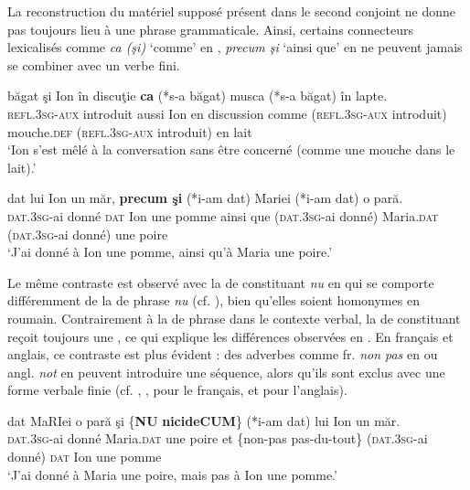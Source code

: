 La reconstruction du matériel supposé présent dans le second conjoint ne donne pas toujours lieu à une phrase grammaticale. Ainsi, certains connecteurs lexicalisés comme \textit{ca (şi)} ‘comme’ en , \textit{precum şi} ‘ainsi que’ en  ne peuvent jamais se combiner avec un verbe fini.

\ea \label{ch2:ex287}
\ea 
\gll {}  băgat  şi  Ion  în  discuţie  \textbf{ca}  (*s-a  băgat) musca  (*s-a  băgat)  în  lapte. \label{ch2:ex287a}\\ 
\textsc{refl.3sg-aux} introduit  aussi  Ion  en  discussion  comme  (\textsc{refl.3sg-aux} introduit) mouche.\textsc{def} (\textsc{refl.3sg-aux} introduit) en  lait\\
\glt ‘Ion s’est mêlé à la conversation sans être concerné (comme une mouche dans le lait).’

\ex  
\gll {}  dat  lui  Ion  un  măr,  \textbf{precum  şi}  (*i-am  dat) Mariei  (*i-am  dat)  o  pară. \label{ch2:ex287b}\\ 
\textsc{dat.3sg-}ai  donné  \textsc{dat}  Ion  une  pomme  {ainsi  que}  (\textsc{dat.3sg-}ai  donné) Maria.\textsc{dat}  (\textsc{dat.3sg-}ai  donné)  une  poire\\
\glt ‘J’ai donné à Ion une pomme, ainsi qu’à Maria une poire.’
\z
\z

Le même contraste est observé avec la  de constituant \textit{nu} en  qui se comporte différemment de la  de phrase \textit{nu} (cf. \citealt{Barbu2004}), bien qu’elles soient homonymes en roumain. Contrairement à la  de phrase dans le contexte verbal, la  de constituant reçoit toujours une , ce qui explique les différences observées en . En français et anglais, ce contraste est plus évident : des adverbes comme fr. \textit{non pas} en  ou angl. \textit{not} en  peuvent introduire une séquence, alors qu’ils sont exclus avec une forme verbale finie (cf. \citealt{Mouret2006}, \citealt{Mouret2007}, \citealt{Mouret2008} pour le français, et \citealt{CulicoverEtAl2005} pour l’anglais).

\ea \label{ch2:ex288}
\ea 
\gll {}  dat  MaRIei  o  pară  şi  \{\textbf{NU} {\textbar} \textbf{nicideCUM}\}  (*i-am dat)  lui  Ion  un  măr. \label{ch2:ex288a}\\  
\textsc{dat.3sg}{}-ai  donné  Maria.\textsc{dat}  une  poire  et  \{non-pas {\textbar} pas-du-tout\}  (\textsc{dat.3sg}{}-ai donné) \textsc{dat}  Ion  une  pomme\\
\glt ‘J’ai donné à Maria une poire, mais pas à Ion une pomme.’

